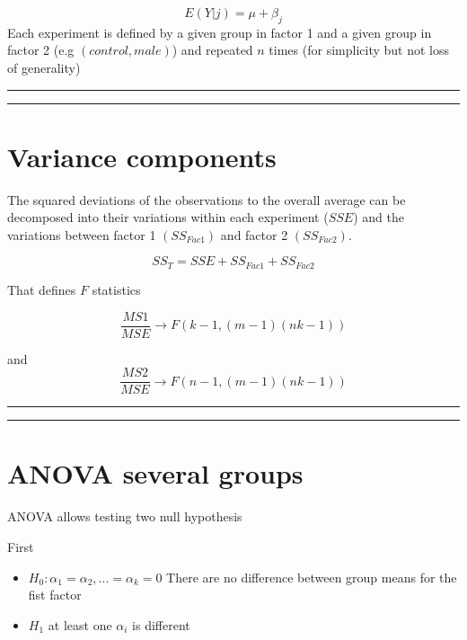 \documentclass[
]{book}
\begin{document}
\[E(Y|j)=\mu + \beta_j\]
Each experiment is defined by a given group in factor 1 and a given group in factor 2 (e.g \((control, male)\)) and repeated \(n\) times (for simplicity but not loss of generality)

\begin{center}\rule{0.5\linewidth}{0.5pt}\end{center}

\begin{center}\rule{0.5\linewidth}{0.5pt}\end{center}

\hypertarget{variance-components-2}{%
\section{Variance components}\label{variance-components-2}}

The squared deviations of the observations to the overall average can be decomposed into their variations within each experiment (\(SSE\)) and the variations between factor 1 \((SS_{Fac1})\) and factor 2 \((SS_{Fac2})\).

\[SS_T= SSE + SS_{Fac1} + SS_{Fac2}\]

That defines \(F\) statistics

\[\frac{MS1}{MSE} \rightarrow F(k-1,(m-1)(nk-1))\]

and \[\frac{MS2}{MSE}\rightarrow F(n-1,(m-1)(nk-1))\]

\begin{center}\rule{0.5\linewidth}{0.5pt}\end{center}

\begin{center}\rule{0.5\linewidth}{0.5pt}\end{center}

\hypertarget{anova-several-groups-5}{%
\section{ANOVA several groups}\label{anova-several-groups-5}}

ANOVA allows testing two null hypothesis

First

\begin{itemize}
\item
  \(H_0: \alpha_1=\alpha_2, ...=\alpha_k=0\) There are no difference between group means for the fist factor
\item
  \(H_1\) at least one \(\alpha_i\) is different
\end{itemize}
\end{document}
